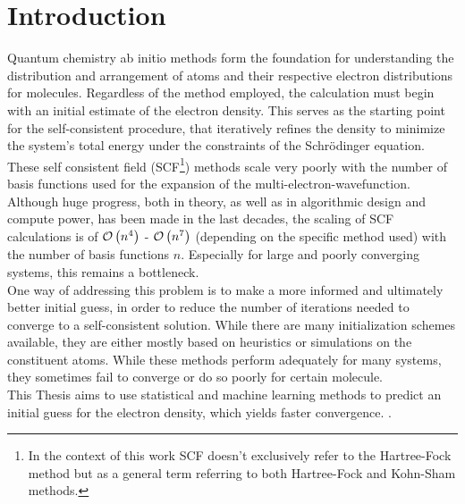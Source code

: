 \chapter{Introduction}
\label{sec:introduction}

Quantum chemistry ab initio methods form the foundation for understanding the distribution and arrangement of atoms and their respective electron distributions for molecules. Regardless of the method employed, the calculation must begin with an initial estimate of the electron density. This serves as the starting point for the self-consistent procedure, that iteratively refines the density to minimize the system's total energy under the constraints of the Schrödinger equation. These self consistent field (SCF\footnote{In the context of this work SCF doesn't exclusively refer to the Hartree-Fock method but as a general term referring to both Hartree-Fock and Kohn-Sham methods.}) methods scale very poorly with the number of basis functions used for the expansion of the multi-electron-wavefunction. Although huge progress, both in theory, as well as in algorithmic design and compute power, has been made in the last decades, the scaling of SCF calculations is of $\mathcal{O}\left(n^4\right)$ - $\mathcal{O}\left(n^7\right)$ (depending on the specific method used) with the number of basis functions $n$. Especially for large and poorly converging systems, this remains a bottleneck. \\

One way of addressing this problem is to make a more informed and ultimately better initial guess, in order to reduce the number of iterations needed to converge to a self-consistent solution. While there are many initialization schemes available, they are either mostly based on heuristics or simulations on the constituent atoms. While these methods perform adequately for many systems, they sometimes fail to converge or do so poorly for certain molecule. \\
This Thesis aims to use statistical and machine learning methods to predict an initial guess for the electron density, which yields faster convergence. . 


